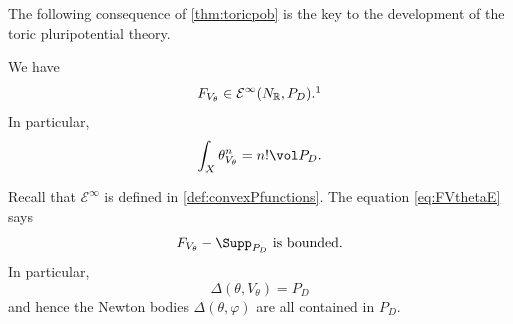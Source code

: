 The following consequence of \cref{thm:toricpob} is the key to the development of the toric pluripotential theory.
\begin{theorem}\label{thm:FVtheta}
    We have
    \begin{equation}\label{eq:FVthetaE}
    F_{V_{\theta}}\in \mathcal{E}^{\infty}(N_{\mathbb{R}},P_D).\footnotemark
    \end{equation}
    In particular,
    \begin{equation}\label{eq:toricminsingmass}
        \int_X  \theta_{V_{\theta}}^n=n!\vol P_D.
    \end{equation}
\end{theorem}
Recall that $\mathcal{E}^{\infty}$ is defined in \cref{def:convexPfunctions}. The equation \eqref{eq:FVthetaE} says
\begin{equation}\label{eq:FSupp_bdd_temp1}
F_{V_{\theta}}-\Supp_{P_D} \textup{ is bounded}.
\end{equation}
In particular,
\begin{equation}\label{eq:DeltaVthetaPD_temp1}
\Delta(\theta,V_{\theta})=P_D
\end{equation}
and hence the Newton bodies $\Delta(\theta,\varphi)$ are all contained in $P_D$.

